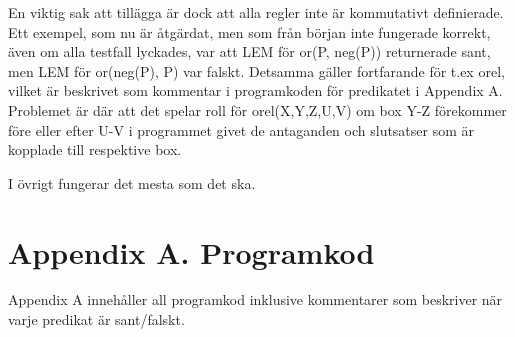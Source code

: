\documentclass[a4paper]{article}
\begin{document}
En viktig sak att tillägga är dock att alla regler inte är kommutativt definierade. Ett exempel, som nu är åtgärdat, men som från början
inte fungerade korrekt, även om alla testfall lyckades, var att LEM för or(P, neg(P)) returnerade sant, men LEM för or(neg(P), P) var falskt. Detsamma gäller fortfarande för t.ex orel, vilket är beskrivet som kommentar i programkoden för predikatet i Appendix A. Problemet är där att
det spelar roll för orel(X,Y,Z,U,V) om box Y-Z förekommer före eller efter U-V i programmet givet de antaganden och slutsatser som är kopplade till respektive box.

I övrigt fungerar det mesta som det ska.
\newpage
\section{Appendix A. Programkod}
Appendix A innehåller all programkod inklusive kommentarer som beskriver när varje predikat är sant/falskt.
\end{document}
